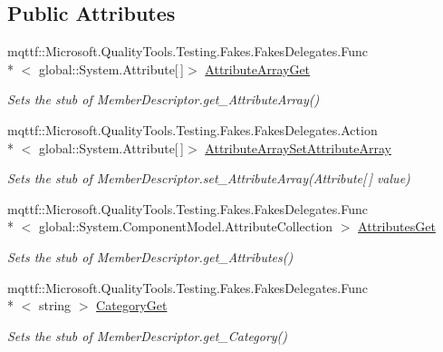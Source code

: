 \subsection*{Public Attributes}
\begin{DoxyCompactItemize}
\item 
mqttf\-::\-Microsoft.\-Quality\-Tools.\-Testing.\-Fakes.\-Fakes\-Delegates.\-Func\\*
$<$ global\-::\-System.\-Attribute\mbox{[}$\,$\mbox{]}$>$ \hyperlink{class_system_1_1_component_model_1_1_fakes_1_1_stub_member_descriptor_a04e06b41e95f973143937929338424c4}{Attribute\-Array\-Get}
\begin{DoxyCompactList}\small\item\em Sets the stub of Member\-Descriptor.\-get\-\_\-\-Attribute\-Array()\end{DoxyCompactList}\item 
mqttf\-::\-Microsoft.\-Quality\-Tools.\-Testing.\-Fakes.\-Fakes\-Delegates.\-Action\\*
$<$ global\-::\-System.\-Attribute\mbox{[}$\,$\mbox{]}$>$ \hyperlink{class_system_1_1_component_model_1_1_fakes_1_1_stub_member_descriptor_a898e120787eafb8d47519974dd9ed45d}{Attribute\-Array\-Set\-Attribute\-Array}
\begin{DoxyCompactList}\small\item\em Sets the stub of Member\-Descriptor.\-set\-\_\-\-Attribute\-Array(\-Attribute\mbox{[}$\,$\mbox{]} value)\end{DoxyCompactList}\item 
mqttf\-::\-Microsoft.\-Quality\-Tools.\-Testing.\-Fakes.\-Fakes\-Delegates.\-Func\\*
$<$ global\-::\-System.\-Component\-Model.\-Attribute\-Collection $>$ \hyperlink{class_system_1_1_component_model_1_1_fakes_1_1_stub_member_descriptor_a0eed2477a38288ba95bb1611b3517108}{Attributes\-Get}
\begin{DoxyCompactList}\small\item\em Sets the stub of Member\-Descriptor.\-get\-\_\-\-Attributes()\end{DoxyCompactList}\item 
mqttf\-::\-Microsoft.\-Quality\-Tools.\-Testing.\-Fakes.\-Fakes\-Delegates.\-Func\\*
$<$ string $>$ \hyperlink{class_system_1_1_component_model_1_1_fakes_1_1_stub_member_descriptor_a92fe0d04f0d41d8044e8417b5fcc3353}{Category\-Get}
\begin{DoxyCompactList}\small\item\em Sets the stub of Member\-Descriptor.\-get\-\_\-\-Category()\end{DoxyCompactList}\item 

\end{DoxyCompactItemize}
